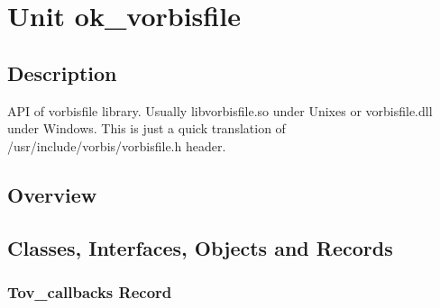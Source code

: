 \documentclass{report}
\newif\ifpdf
\begin{document}
\label{toc}\tableofcontents
\newpage
\newlength{\tmplength}
\chapter{Unit ok{\_}vorbisfile}
\label{ok_vorbisfile}
\section{Description}
API of vorbisfile library. Usually libvorbisfile.so under Unixes or vorbisfile.dll under Windows. This is just a quick translation of /usr/include/vorbis/vorbisfile.h header.
\section{Overview}
\begin{description}
\item[\texttt{\begin{ttfamily}Tov{\_}callbacks\end{ttfamily} Record}]
\item[\texttt{\begin{ttfamily}TOggVorbis{\_}File\end{ttfamily} Record}]
\end{description}
\section{Classes, Interfaces, Objects and Records}
\ifpdf
\subsection*{\large{\textbf{Tov{\_}callbacks Record}}\normalsize\hspace{1ex}\hrulefill}
\else
\subsection*{Tov{\_}callbacks Record}
\fi
\label{ok_vorbisfile.Tov_callbacks}
\end{document}
